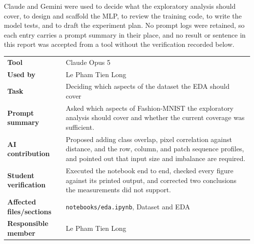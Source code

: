 
Claude and Gemini were used to decide what the exploratory analysis should cover, to design and scaffold the MLP, to review the training code, to write the model tests, and to draft the experiment plan. No prompt logs were retained, so each entry
carries a prompt summary in their place, and no result or sentence in this report was accepted
from a tool without the verification recorded below.

\noindent\begin{minipage}{\textwidth}
\begin{tabularx}{\textwidth}{lX}
\hline
\textbf{Tool} & Claude Opus 5 \\
\textbf{Used by} & Le Pham Tien Long \\
\textbf{Task} & Deciding which aspects of the dataset the EDA should cover \\
\textbf{Prompt summary} & Asked which aspects of Fashion-MNIST the exploratory analysis should cover and whether the current coverage was sufficient. \\
\textbf{AI contribution} & Proposed adding class overlap, pixel correlation against distance, and the row, column, and patch sequence profiles, and pointed out that input size and imbalance are required. \\
\textbf{Student verification} & Executed the notebook end to end, checked every figure against its printed output, and corrected two conclusions the measurements did not support. \\
\textbf{Affected files/sections} & \texttt{notebooks/eda.ipynb}, Dataset and EDA \\
\textbf{Responsible member} & Le Pham Tien Long \\
\hline
\end{tabularx}
\end{minipage}

